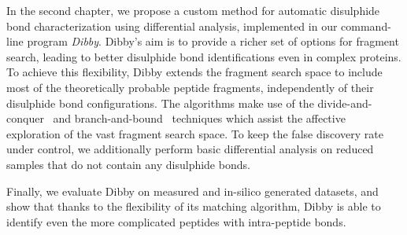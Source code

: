 In the second chapter, we propose a custom method for automatic disulphide bond characterization using differential analysis, implemented in our command-line program \emph{Dibby}. Dibby's aim is to provide a richer set of options for fragment search, leading to better disulphide bond identifications even in complex proteins. To achieve this flexibility, Dibby extends the fragment search space to include most of the theoretically probable peptide fragments, independently of their disulphide bond configurations. The algorithms make use of the divide-and-conquer~\cite{smith1985design} and branch-and-bound~\cite{boyd2007branch} techniques which assist the affective exploration of the vast fragment search space. To keep the false discovery rate under control, we additionally perform basic differential analysis on reduced samples that do not contain any disulphide bonds.

Finally, we evaluate Dibby on measured and in-silico generated datasets, and show that thanks to the flexibility of its matching algorithm, Dibby is able to identify even the more complicated peptides with intra-peptide bonds.
